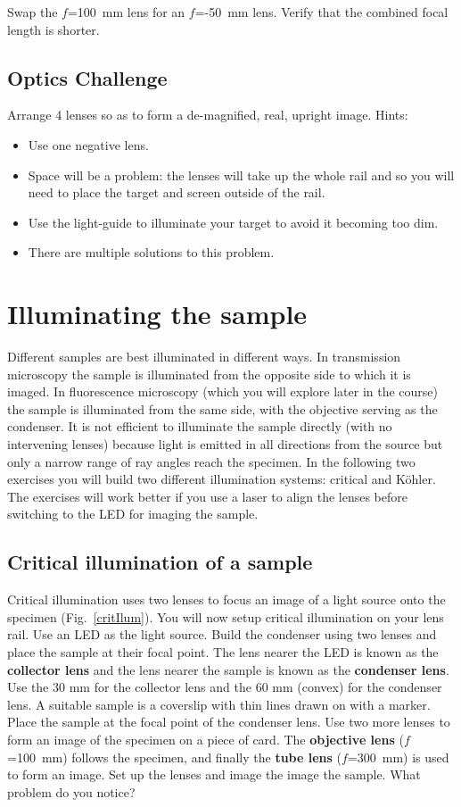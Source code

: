\documentclass[a4paper]{report}
\begin{document}
\noindent
Swap the $f$=100~mm lens for an $f$=-50~mm lens. Verify that the
combined focal length is shorter.

\subsection{Optics Challenge}
Arrange 4 lenses so as to form a de-magnified, real, upright
image. Hints: 
\begin{itemize}
\item Use one negative lens.
\item Space will be a problem: the lenses will take up the whole rail
  and so you will need to place the target and screen outside of the
  rail. 
\item Use the light-guide to illuminate your target to avoid it
  becoming too dim. 
\item There are multiple solutions to this problem.
\end{itemize}


\clearpage
\section{Illuminating the sample}
Different samples are best illuminated in different ways. In transmission
microscopy the sample is illuminated from the opposite side to which
it is imaged. In fluorescence microscopy (which you will explore later
in the course) the sample is illuminated from the same side, with the
objective serving as the condenser. It is not efficient to illuminate
the sample directly (with no intervening lenses) because light is
emitted in all directions from the source but only a narrow range of
ray angles reach the specimen. In the following two exercises you will
build two different illumination systems: critical and K\"{o}hler. The
exercises will work better if you use a laser to align the lenses
before switching to the LED for imaging the sample. 


\subsection{Critical illumination of a sample}
Critical illumination uses two lenses to focus an image of a light
source onto the specimen (Fig.~\ref{critIlum}). You will now setup
critical illumination on your lens rail. Use an LED as the light
source. Build the condenser using two lenses and place the sample at
their focal point. The lens nearer the LED is known as the
\textbf{collector lens} and the lens nearer the sample is known as the
\textbf{condenser lens}. Use the 30 mm for the collector lens and the
60 mm (convex) for the condenser lens. A suitable sample is a
coverslip with thin lines drawn on with a marker. Place the sample at
the focal point of the condenser lens. Use two more lenses to form an
image of the specimen on a piece of card. The \textbf{objective lens}
($f$=100~mm) follows the specimen, and finally the \textbf{tube lens}
($f$=300~mm) is used to form an image. Set up the lenses and image the
image the sample. What problem do you notice?
\end{document}

